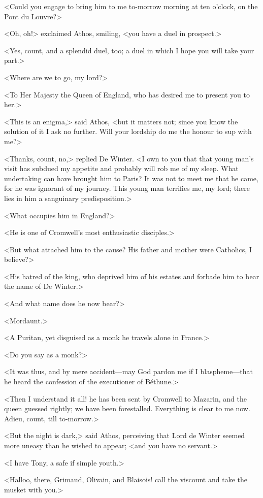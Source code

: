 <Could you engage to bring him to me to-morrow morning at ten o'clock, on the Pont du Louvre?>

<Oh, oh!> exclaimed Athos, smiling, <you have a duel in prospect.>

<Yes, count, and a splendid duel, too; a duel in which I hope you will take your part.>

<Where are we to go, my lord?>

<To Her Majesty the Queen of England, who has desired me to present you to her.>

<This is an enigma,> said Athos, <but it matters not; since you know the solution of it I ask no further. Will your lordship do me the honour to sup with me?>

<Thanks, count, no,> replied De Winter. <I own to you that that young man's visit has subdued my appetite and probably will rob me of my sleep. What undertaking can have brought him to Paris? It was not to meet me that he came, for he was ignorant of my journey. This young man terrifies me, my lord; there lies in him a sanguinary predisposition.>

<What occupies him in England?>

<He is one of Cromwell's most enthusiastic disciples.>

<But what attached him to the cause? His father and mother were Catholics, I believe?>

<His hatred of the king, who deprived him of his estates and forbade him to bear the name of De Winter.>

<And what name does he now bear?>

<Mordaunt.>

<A Puritan, yet disguised as a monk he travels alone in France.>

<Do you say as a monk?>

<It was thus, and by mere accident—may God pardon me if I blaspheme—that he heard the confession of the executioner of Béthune.>

<Then I understand it all! he has been sent by Cromwell to Mazarin, and the queen guessed rightly; we have been forestalled. Everything is clear to me now. Adieu, count, till to-morrow.>

<But the night is dark,> said Athos, perceiving that Lord de Winter seemed more uneasy than he wished to appear; <and you have no servant.>

<I have Tony, a safe if simple youth.>

<Halloo, there, Grimaud, Olivain, and Blaisois! call the viscount and take the musket with you.>

